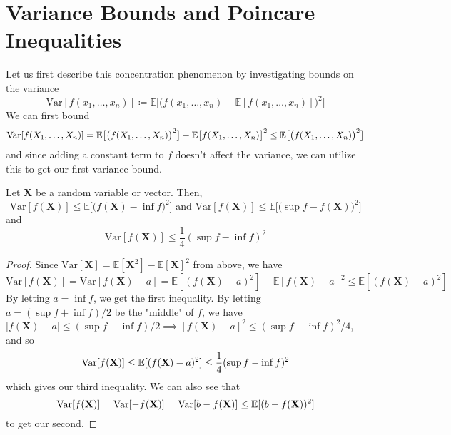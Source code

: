 \section{Variance Bounds and Poincare Inequalities}

  Let us first describe this concentration phenomenon by investigating bounds on the variance 
  \[\mathrm{Var}[f(x_1, \ldots, x_n)] \coloneqq \mathbb{E}\big[ \big( f(x_1, \ldots, x_n) - \mathbb{E}[f(x_1, \ldots, x_n)] \big)^2 \big] \]
  We can first bound 
  \[\operatorname{Var}[f(X_1, \ldots, X_n)] = \mathbb{E}\big[ \big( f(X_1, \ldots, X_n)\big)^2 \big] - \mathbb{E}\big[ f(X_1, \ldots, X_n) \big]^2 \leq \mathbb{E}\big[ \big( f(X_1, \ldots, X_n)\big)^2 \big]\]
  and since adding a constant term to $f$ doesn't affect the variance, we can utilize this to get our first variance bound. 

  \begin{lemma}
  Let $\mathbf{X}$ be a random variable or vector. Then, 
  \[\mathrm{Var}[f(\mathbf{X})] \leq \mathbb{E} \big[ \big( f(\mathbf{X}) - \inf f \big)^2 \big] \text{ and } \mathrm{Var}[f(\mathbf{X})] \leq \mathbb{E} \big[ \big(\sup f - f(\mathbf{X}) \big)^2 \big]\]
  and 
  \[\mathrm{Var}[ f(\mathbf{X})] \leq \frac{1}{4} ( \sup f - \inf f)^2\]
  \end{lemma}
  \begin{proof} 
  Since $\mathrm{Var}[\mathbf{X}] = \mathbb{E}[\mathbf{X}^2] - \mathbb{E}[\mathbf{X}]^2$ from above, we have 
  \[\mathrm{Var}[ f(\mathbf{X})] = \mathrm{Var}[f(\mathbf{X}) - a] = \mathbb{E}[(f(\mathbf{X}) - a)^2] - \mathbb{E}[f(\mathbf{X}) - a]^2 \leq \mathbb{E}[(f(\mathbf{X}) - a)^2]\]
  By letting $a = \inf f$, we get the first inequality. By letting $a = (\sup f + \inf f) /2$ be the "middle" of $f$, we have $|f(\mathbf{X}) - a| \leq (\sup f - \inf f)/2 \implies [f(\mathbf{X}) - a]^2 \leq (\sup f - \inf f)^2/4$, and so 
  \[\operatorname{Var}[ f(\mathbf{X})] \leq \mathbb{E}[(f(\mathbf{X}) - a)^2] \leq \frac{1}{4} (\sup f - \inf f)^2\]
  which gives our third inequality. We can also see that 
  \[\mathrm{Var}[ f(\mathbf{X})] = \operatorname{Var}[ -f (\mathbf{X})] = \operatorname{Var}[ b - f(\mathbf{X})] \leq \mathbb{E}[ (b - f(\mathbf{X}))^2]\]
  to get our second. 
  \end{proof} 

